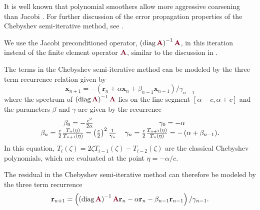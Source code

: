 It is well known that polynomial smoothers allow more aggressive coarsening than Jacobi \cite{brannick2015polynomial}.
For further discussion of the error propagation properties of the Chebyshev semi-iterative method, see \cite{gutknecht2002revisited}.

We use the Jacobi preconditioned operator, $\left( \diag {\color{burgundy}\mathbf{A}} \right)^{-1} {\color{burgundy}\mathbf{A}}$, in this iteration instead of the finite element operator ${\color{burgundy}\mathbf{A}}$, similar to the discussion in \cite{adams2003parallel}.

The terms in the Chebyshev semi-iterative method can be modeled by the three term recurrence relation given by
\begin{equation}
\mathbf{x}_{n + 1} = - \left( \mathbf{r}_n + \alpha \mathbf{x}_n + \beta_{n - 1} \mathbf{x}_{n - 1} \right) / \gamma_{n - 1}
\label{eq:chebyshev_recursive}
\end{equation}
where the spectrum of $\left( \diag {\color{burgundy}\mathbf{A}} \right)^{-1} {\color{burgundy}\mathbf{A}}$ lies on the line segment $\left[ \alpha - c, \alpha + c \right]$ and the parameters $\beta$ and $\gamma$ are given by the recurrence
\begin{equation}
\begin{tabular}{c c}
$\beta_0 = - \frac{c^2}{2 \alpha}$ & $\gamma_0 = - \alpha$\\
$\beta_n = \frac{c}{2} \frac{T_n \left( \eta \right)}{T_{n + 1} \left( \eta \right)} = \left( \frac{c}{2} \right)^2 \frac{1}{\gamma_n}$ & $\gamma_n = \frac{c}{2} \frac{T_{n + 1} \left( \eta \right)}{T_n \left( \eta \right)} = - \left( \alpha + \beta_{n - 1} \right)$.
\end{tabular}
\end{equation}
In this equation, $T_i \left( \zeta \right) = 2 \zeta T_{i - 1} \left( \zeta \right) - T_{i - 2} \left( \zeta \right)$ are the classical Chebyshev polynomials, which are evaluated at the point $\eta = - \alpha / c$.

The residual in the Chebyshev semi-iterative method can therefore be modeled by the three term recurrence
\begin{equation}
\mathbf{r}_{n + 1} = \left( \left( \diag {\color{burgundy}\mathbf{A}} \right)^{-1} {\color{burgundy}\mathbf{A}} \mathbf{r}_n - \alpha \mathbf{r}_n - \beta_{n - 1} \mathbf{r}_{n - 1} \right) / \gamma_{n - 1}.
\label{eq:chebyshev_error_recursive}
\end{equation}

